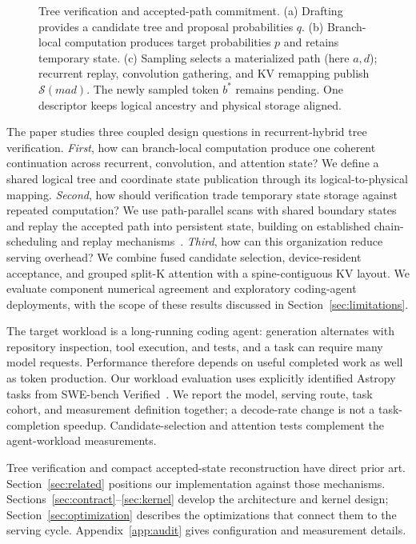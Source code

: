 \documentclass[conference]{IEEEtran}
\begin{document}
\begin{figure}[t]
\centering
\resizebox{\textwidth}{!}{}
\caption{Tree verification and accepted-path commitment. (a) Drafting provides a candidate tree and proposal probabilities $q$. (b) Branch-local computation produces target probabilities $p$ and retains temporary state. (c) Sampling selects a materialized path (here $a,d$); recurrent replay, convolution gathering, and KV remapping publish $\mathcal{S}(mad)$. The newly sampled token $b^*$ remains pending. One descriptor keeps logical ancestry and physical storage aligned.}
\label{fig:pipeline}
\end{figure}

The paper studies three coupled design questions in recurrent-hybrid tree verification. \textit{First}, how can branch-local computation produce one coherent continuation across recurrent, convolution, and attention state? We define a shared logical tree and coordinate state publication through its logical-to-physical mapping. \textit{Second}, how should verification trade temporary state storage against repeated computation? We use path-parallel scans with shared boundary states and replay the accepted path into persistent state, building on established chain-scheduling and replay mechanisms~\cite{wang2026specla,oda2026marginals}. \textit{Third}, how can this organization reduce serving overhead? We combine fused candidate selection, device-resident acceptance, and grouped split-K attention with a spine-contiguous KV layout. We evaluate component numerical agreement and exploratory coding-agent deployments, with the scope of these results discussed in Section~\ref{sec:limitations}.

The target workload is a long-running coding agent: generation alternates with repository inspection, tool execution, and tests, and a task can require many model requests. Performance therefore depends on useful completed work as well as token production. Our workload evaluation uses explicitly identified Astropy tasks from SWE-bench Verified~\cite{jimenez2024swe}. We report the model, serving route, task cohort, and measurement definition together; a decode-rate change is not a task-completion speedup. Candidate-selection and attention tests complement the agent-workload measurements.

Tree verification and compact accepted-state reconstruction have direct prior art. Section~\ref{sec:related} positions our implementation against those mechanisms. Sections~\ref{sec:contract}--\ref{sec:kernel} develop the architecture and kernel design; Section~\ref{sec:optimization} describes the optimizations that connect them to the serving cycle. Appendix~\ref{app:audit} gives configuration and measurement details.
\end{document}
